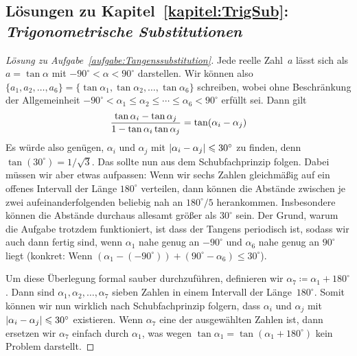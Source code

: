 \subsection*{Lösungen zu Kapitel~\ref{kapitel:TrigSub}: \emph{Trigonometrische Substitutionen}}

\begin{proof}[Lösung zu Aufgabe~\ref{aufgabe:Tangenssubstitution}]
	Jede reelle Zahl~$a$ lässt sich als $a=\tan\alpha$ mit $-90^\circ<\alpha<90^\circ$ darstellen. Wir können also $\{a_1,a_2,\dotsc,a_6\}=\{\tan\alpha_1,\tan\alpha_2,\dotsc,\tan\alpha_6\}$ schreiben, wobei ohne Beschränkung der Allgemeinheit $-90^\circ<\alpha_1\leqslant\alpha_2\leqslant\dotsb\leqslant\alpha_6<90^\circ$ erfüllt sei. Dann gilt
	\begin{equation*}
		\frac{\tan\alpha_i-\tan\alpha_j}{1-\tan\alpha_i\tan\alpha_j}=\tan\parens*{\alpha_i-\alpha_j}
	\end{equation*}
	Es würde also genügen, $\alpha_i$ und $\alpha_j$ mit $\lvert\alpha_i-\alpha_j\rvert\leqslant 30^\circ$ zu finden, denn $\tan(30^\circ)={1}/{\sqrt{3}}$. Das sollte nun aus dem Schubfachprinzip folgen. Dabei müssen wir aber etwas aufpassen: Wenn wir sechs Zahlen gleichmäßig auf ein offenes Intervall der Länge $180^\circ$ verteilen, dann können die Abstände zwischen je zwei aufeinanderfolgenden beliebig nah an $180^\circ/5$ herankommen. Insbesondere können die Abstände durchaus allesamt größer als $30^\circ$ sein. Der Grund, warum die Aufgabe trotzdem funktioniert, ist dass der Tangens periodisch ist, sodass wir auch dann fertig sind, wenn $\alpha_1$ nahe genug an $-90^\circ$ und $\alpha_6$ nahe genug an $90^\circ$ liegt (konkret: Wenn $(\alpha_1-(-90^\circ))+(90^\circ-\alpha_6)\leqslant 30^\circ$).
	
	Um diese Überlegung formal sauber durchzuführen, definieren wir $\alpha_7\coloneqq \alpha_1+180^\circ$. Dann sind $\alpha_1,\alpha_2,\dotsc,\alpha_7$ sieben Zahlen in einem Intervall der Länge~$180^\circ$. Somit können wir nun wirklich nach Schubfachprinzip folgern, dass $\alpha_i$ und $\alpha_j$ mit $\lvert\alpha_i-\alpha_j\rvert\leqslant 30^\circ$ existieren. Wenn $\alpha_7$ eine der ausgewählten Zahlen ist, dann ersetzen wir $\alpha_7$ einfach durch $\alpha_1$, was wegen $\tan\alpha_1=\tan(\alpha_1+180^\circ)$ kein Problem darstellt.
\end{proof}

